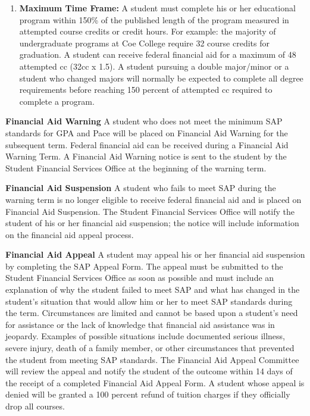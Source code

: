 \documentclass[
  letterpaper,
]{scrbook}
\providecommand{\tightlist}{%
  \setlength{\itemsep}{0pt}\setlength{\parskip}{0pt}}
\begin{document}
\begin{enumerate}
\def\labelenumi{\arabic{enumi}.}
\setcounter{enumi}{2}
\tightlist
\item
  \textbf{Maximum Time Frame:} A student must complete his or her
  educational program within 150\% of the published length of the
  program measured in attempted course credits or credit hours. For
  example: the majority of undergraduate programs at Coe College require
  32 course credits for graduation. A student can receive federal
  financial aid for a maximum of 48 attempted cc (32cc x 1.5). A student
  pursuing a double major/minor or a student who changed majors will
  normally be expected to complete all degree requirements before
  reaching 150 percent of attempted cc required to complete a program.
\end{enumerate}

\textbf{Financial Aid Warning} A student who does not meet the minimum
SAP standards for GPA and Pace will be placed on Financial Aid Warning
for the subsequent term. Federal financial aid can be received during a
Financial Aid Warning Term. A Financial Aid Warning notice is sent to
the student by the Student Financial Services Office at the beginning of
the warning term.

\textbf{Financial Aid Suspension} A student who fails to meet SAP during
the warning term is no longer eligible to receive federal financial aid
and is placed on Financial Aid Suspension. The Student Financial
Services Office will notify the student of his or her financial aid
suspension; the notice will include information on the financial aid
appeal process.

\textbf{Financial Aid Appeal} A student may appeal his or her financial
aid suspension by completing the SAP Appeal Form. The appeal must be
submitted to the Student Financial Services Office as soon as possible
and must include an explanation of why the student failed to meet SAP
and what has changed in the student's situation that would allow him or
her to meet SAP standards during the term. Circumstances are limited and
cannot be based upon a student's need for assistance or the lack of
knowledge that financial aid assistance was in jeopardy. Examples of
possible situations include documented serious illness, severe injury,
death of a family member, or other circumstances that prevented the
student from meeting SAP standards. The Financial Aid Appeal Committee
will review the appeal and notify the student of the outcome within 14
days of the receipt of a completed Financial Aid Appeal Form. A student
whose appeal is denied will be granted a 100 percent refund of tuition
charges if they officially drop all courses.
\end{document}
